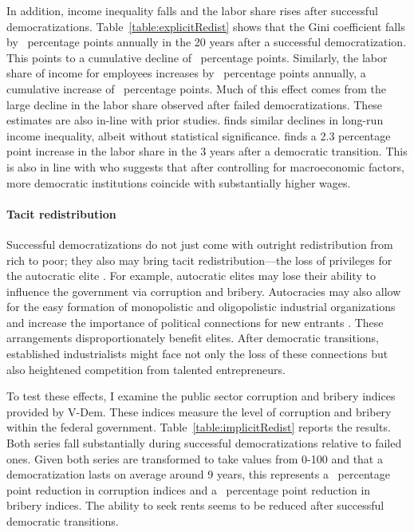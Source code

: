 \documentclass[12pt]{article}
\numberwithin{equation}{section}
\begin{document}
In addition, income inequality falls and the labor share rises after successful democratizations.  Table~\ref{table:explicitRedist} shows that the Gini coefficient falls by \tabEightcolThreePE\ percentage points annually in the 20 years after a successful democratization. This points to a cumulative decline of \tabEightThreeCE\ percentage points.  Similarly, the labor share of income for employees increases by \tabEightcolFourPE\ percentage points annually, a cumulative increase of \tabEightFourCE\ percentage points. Much of this effect comes from the large decline in the labor share observed after failed democratizations. These estimates are also in-line with prior studies. \cite{Acemoglu2015} finds similar declines in long-run income inequality, albeit without statistical significance. \cite*{Drautzburg2022}  finds a 2.3 percentage point increase in the labor share in the 3 years after a democratic transition. This is also in line with \cite{Rodrik1999} who suggests that after controlling for macroeconomic factors, more democratic institutions coincide with substantially higher wages.

\paragraph{Tacit redistribution}
Successful democratizations do not just come with outright redistribution from rich to poor; they also may bring tacit redistribution---the loss of privileges for the autocratic elite \citep{Tullock1986}. For example, autocratic elites may lose their ability to influence the government via corruption and bribery. Autocracies may also allow for the easy formation of monopolistic and oligopolistic industrial organizations \citep{Li2003,Perotti2006,Karolyi2017} and increase the importance of political connections for new entrants \citep*{Li2008}. These arrangements disproportionately benefit elites. After democratic transitions, established industrialists might face not only the loss of these connections but also heightened competition from talented entrepreneurs.

To test these effects, I examine the public sector corruption and bribery indices provided by V-Dem. These indices measure the level of corruption and bribery within the federal government. Table~\ref{table:implicitRedist} reports the results. Both series fall substantially during successful democratizations relative to failed ones. Given both series are transformed to take values from 0-100 and that a democratization lasts on average around 9 years, this represents a \tabNineOneCE\ percentage point reduction in corruption indices and a \tabNineTwoCE\ percentage point reduction in bribery indices. The ability to seek rents seems to be reduced after successful democratic transitions. 
\end{document}
